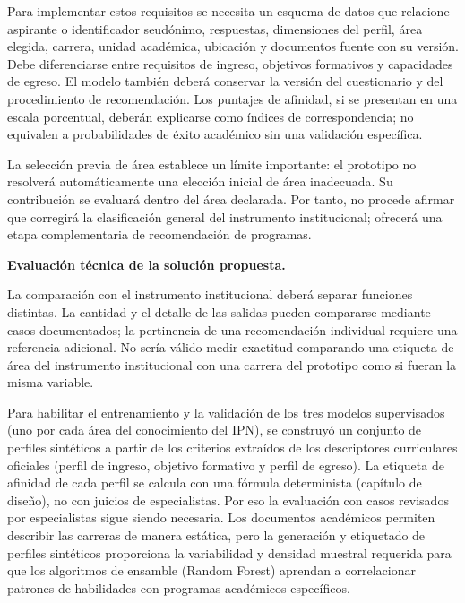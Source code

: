 Para implementar estos requisitos se necesita un esquema de datos que relacione aspirante o identificador seudónimo, respuestas, dimensiones del perfil, área elegida, carrera, unidad académica, ubicación y documentos fuente con su versión. Debe diferenciarse entre requisitos de ingreso, objetivos formativos y capacidades de egreso. El modelo también deberá conservar la versión del cuestionario y del procedimiento de recomendación. Los puntajes de afinidad, si se presentan en una escala porcentual, deberán explicarse como índices de correspondencia; no equivalen a probabilidades de éxito académico sin una validación específica.

La selección previa de área establece un límite importante: el prototipo no resolverá automáticamente una elección inicial de área inadecuada. Su contribución se evaluará dentro del área declarada. Por tanto, no procede afirmar que corregirá la clasificación general del instrumento institucional; ofrecerá una etapa complementaria de recomendación de programas.

\noindent\textbf{Evaluación técnica de la solución propuesta.}\par\smallskip
\label{sec:validacion-ppp}

La comparación con el instrumento institucional deberá separar funciones distintas. La cantidad y el detalle de las salidas pueden compararse mediante casos documentados; la pertinencia de una recomendación individual requiere una referencia adicional. No sería válido medir exactitud comparando una etiqueta de área del instrumento institucional con una carrera del prototipo como si fueran la misma variable.

Para habilitar el entrenamiento y la validación de los tres modelos supervisados (uno por cada área del conocimiento del IPN), se construyó un conjunto de perfiles sintéticos a partir de los criterios extraídos de los descriptores curriculares oficiales (perfil de ingreso, objetivo formativo y perfil de egreso). La etiqueta de afinidad de cada perfil se calcula con una fórmula determinista (capítulo de diseño), no con juicios de especialistas. Por eso la evaluación con casos revisados por especialistas sigue siendo necesaria. Los documentos académicos permiten describir las carreras de manera estática, pero la generación y etiquetado de perfiles sintéticos proporciona la variabilidad y densidad muestral requerida para que los algoritmos de ensamble (Random Forest) aprendan a correlacionar patrones de habilidades con programas académicos específicos.

